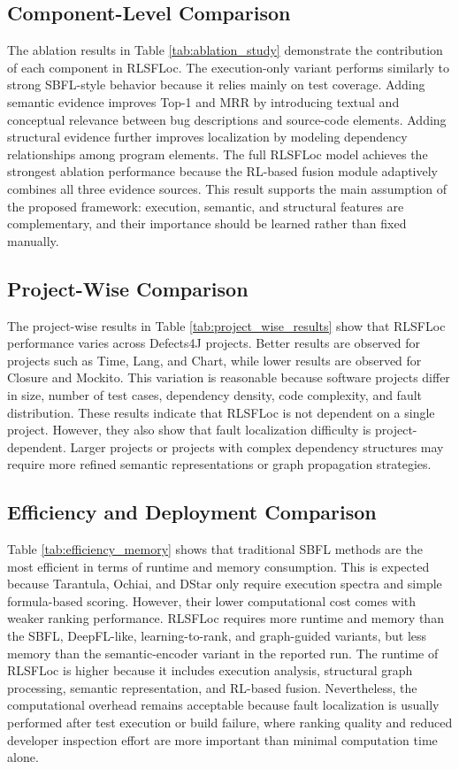 \documentclass[article,article,submit,pdftex,moreauthors]{Definitions/mdpi}
\begin{document}
\subsection{Component-Level Comparison}

The ablation results in Table \ref{tab:ablation_study} demonstrate the contribution of each component in RLSFLoc. The execution-only variant performs similarly to strong SBFL-style behavior because it relies mainly on test coverage. Adding semantic evidence improves Top-1 and MRR by introducing textual and conceptual relevance between bug descriptions and source-code elements. Adding structural evidence further improves localization by modeling dependency relationships among program elements. The full RLSFLoc model achieves the strongest ablation performance because the RL-based fusion module adaptively combines all three evidence sources. This result supports the main assumption of the proposed framework: execution, semantic, and structural features are complementary, and their importance should be learned rather than fixed manually.

\subsection{Project-Wise Comparison}

The project-wise results in Table \ref{tab:project_wise_results} show that RLSFLoc performance varies across Defects4J projects. Better results are observed for projects such as Time, Lang, and Chart, while lower results are observed for Closure and Mockito. This variation is reasonable because software projects differ in size, number of test cases, dependency density, code complexity, and fault distribution. These results indicate that RLSFLoc is not dependent on a single project. However, they also show that fault localization difficulty is project-dependent. Larger projects or projects with complex dependency structures may require more refined semantic representations or graph propagation strategies.

\subsection{Efficiency and Deployment Comparison}

Table \ref{tab:efficiency_memory} shows that traditional SBFL methods are the most efficient in terms of runtime and memory consumption. This is expected because Tarantula, Ochiai, and DStar only require execution spectra and simple formula-based scoring. However, their lower computational cost comes with weaker ranking performance. RLSFLoc requires more runtime and memory than the SBFL, DeepFL-like, learning-to-rank, and graph-guided variants, but less memory than the semantic-encoder variant in the reported run. The runtime of RLSFLoc is higher because it includes execution analysis, structural graph processing, semantic representation, and RL-based fusion. Nevertheless, the computational overhead remains acceptable because fault localization is usually performed after test execution or build failure, where ranking quality and reduced developer inspection effort are more important than minimal computation time alone.
\end{document}
